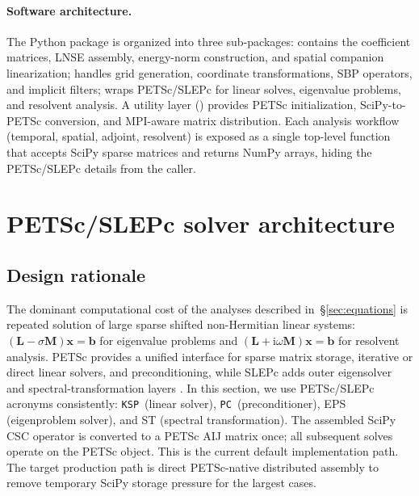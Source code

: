 \documentclass[11pt]{article}
\newcommand{\bx}{\mathbf{x}}
\newcommand{\bL}{\mathbf{L}}
\newcommand{\bM}{\mathbf{M}}
\newcommand{\bb}{\mathbf{b}}
\newcommand{\KSP}{\texttt{KSP}}
\newcommand{\PC}{\texttt{PC}}
\begin{document}
\paragraph{Software architecture.}
The Python package is organized into three sub-packages:
 contains the coefficient matrices, LNSE assembly, energy-norm construction, and spatial companion linearization;
 handles grid generation, coordinate transformations, SBP operators, and implicit filters;
 wraps PETSc/SLEPc for linear solves, eigenvalue problems, and resolvent analysis.
A utility layer () provides PETSc initialization, SciPy-to-PETSc conversion, and MPI-aware matrix distribution.
Each analysis workflow (temporal, spatial, adjoint, resolvent) is exposed as a single top-level function that accepts SciPy sparse matrices and returns NumPy arrays, hiding the PETSc/SLEPc details from the caller.

\section{PETSc/SLEPc solver architecture}
\label{sec:solvers}

\subsection{Design rationale}
\label{sec:design}

The dominant computational cost of the analyses described in~\S\ref{sec:equations} is repeated solution of large sparse shifted non-Hermitian linear systems: $(\bL - \sigma\bM)\bx = \bb$ for eigenvalue problems and $(\bL + \mathrm{i}\omega\bM)\bx = \bb$ for resolvent analysis.
PETSc provides a unified interface for sparse matrix storage, iterative or direct linear solvers, and preconditioning, while SLEPc adds outer eigensolver and spectral-transformation layers \cite{balay2025petsc,hernandez2005slepc}.
In this section, we use PETSc/SLEPc acronyms consistently: \KSP\ (linear solver), \PC\ (preconditioner), EPS (eigenproblem solver), and ST (spectral transformation).
The assembled SciPy CSC operator is converted to a PETSc AIJ matrix once; all subsequent solves operate on the PETSc object.
This is the current default implementation path.
The target production path is direct PETSc-native distributed assembly to remove temporary SciPy storage pressure for the largest cases.
\end{document}
